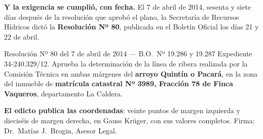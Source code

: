 \begin{cautela}
\textbf{Y la exigencia se cumplió, con fecha.} El 7 de abril de 2014, sesenta y siete días después de la resolución que aprobó el plano, la Secretaría de Recursos Hídricos dictó la \textbf{Resolución Nº 80}, publicada en el Boletín Oficial los días 21 y 22 de abril.

\end{cautela}

\begin{ficha}{Resolución Nº 80 del 7 de abril de 2014 --- B.O.\ Nº 19.286 y 19.287}
Expediente 34-240.329/12. Aprueba la determinación de la línea de ribera realizada por la Comisión Técnica en ambas márgenes del \textbf{arroyo Quintín o Pacará}, en la zona del inmueble de \textbf{matrícula catastral Nº 3989, Fracción 78 de Finca Vaqueros}, departamento La Caldera.

\textbf{El edicto publica las coordenadas}: veinte puntos de margen izquierda y dieciséis de margen derecha, en Gauss Krüger, con sus valores completos. Firma: Dr.\ Matías J.\ Brogin, Asesor Legal.
\end{ficha}

